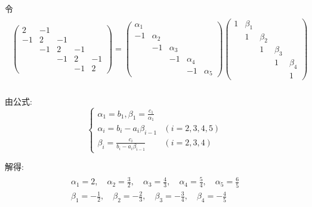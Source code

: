 \documentclass[a4paper]{article}
\begin{document}
令
\begin{equation}
    \begin{aligned}
        \begin{array}{l}{\left(\begin{array}{rrrrr}2 & -1 & & & \\ -1 & 2 & -1 & & \\ & -1 & 2 & -1 & \\ & & -1 & 2 & -1 \\ & & & -1 & 2\end{array}\right)} =\left(\begin{array}{rrrrr}\alpha_{1} & & & & \\ -1 & \alpha_{2} & & & \\ & -1 & \alpha_{3} & & \\ & & -1 & \alpha_{4} & \\ & & & -1 & \alpha_{5}\end{array}\right)\left(\begin{array}{rrrrr}1 & \beta_{1} & & & \\ & 1 & \beta_{2} & & \\ & & 1 & \beta_{3} & \\ & & & 1 & \beta_{4} \\ & & & & 1\end{array}\right) \\\end{array} \nonumber
    \end{aligned}
\end{equation} \par
由公式:
\begin{equation}
    \left\{\begin{array}{ll}\alpha_{1}=b_{1}, \beta_{1}=\frac{c_{1}}{\alpha_{1}} & \\ \alpha_i=b_i-a_i\beta_{i-1} & (i=2,3,4,5) \\ \beta_i = \frac{c_i}{b_i-a_i\beta_{i-1}} & (i=2,3,4)\end{array}\right. \nonumber
\end{equation} \par
解得:
\begin{eqnarray}
    \begin{array}{l}\alpha_{1}=2, \quad \alpha_{2}=\frac{3}{2}, \quad \alpha_{3}=\frac{4}{3}, \quad \alpha_{4}=\frac{5}{4}, \quad \alpha_{5}=\frac{6}{5} \\ \beta_{1}=-\frac{1}{2}, \quad \beta_{2}=-\frac{2}{3}, \quad \beta_{3}=-\frac{3}{4}, \quad \beta_{4}=-\frac{4}{5}\end{array}\nonumber
\end{eqnarray} \par
\end{document}
